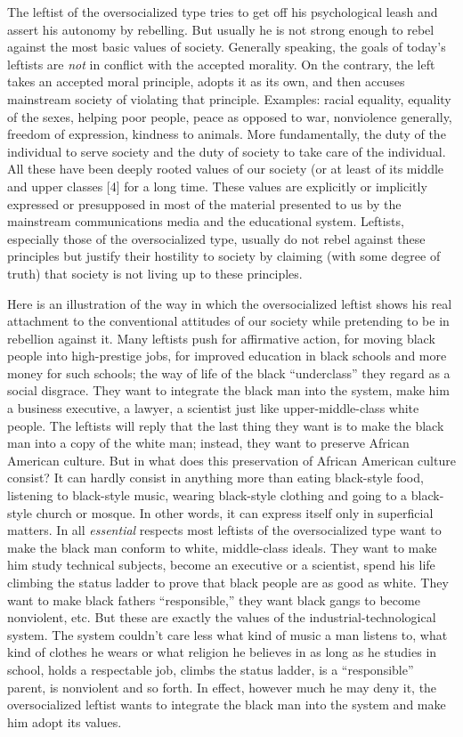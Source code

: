  The leftist of the oversocialized type tries to get off his psychological leash and assert his autonomy by rebelling. But usually he is not strong enough to rebel against the most basic values of society. Generally speaking, the goals of today’s leftists are {\em not} in conflict with the accepted morality. On the contrary, the left takes an accepted moral principle, adopts it as its own, and then accuses mainstream society of violating that principle. Examples: racial equality, equality of the sexes, helping poor people, peace as opposed to war, nonviolence generally, freedom of expression, kindness to animals. More fundamentally, the duty of the individual to serve society and the duty of society to take care of the individual. All these have been deeply rooted values of our society (or at least of its middle and upper classes [4] for a long time. These values are explicitly or implicitly expressed or presupposed in most of the material presented to us by the mainstream communications media and the educational system. Leftists, especially those of the oversocialized type, usually do not rebel against these principles but justify their hostility to society by claiming (with some degree of truth) that society is not living up to these principles.

 Here is an illustration of the way in which the oversocialized leftist shows his real attachment to the conventional attitudes of our society while pretending to be in rebellion against it. Many leftists push for affirmative action, for moving black people into high-prestige jobs, for improved education in black schools and more money for such schools; the way of life of the black “underclass” they regard as a social disgrace. They want to integrate the black man into the system, make him a business executive, a lawyer, a scientist just like upper-middle-class white people. The leftists will reply that the last thing they want is to make the black man into a copy of the white man; instead, they want to preserve African American culture. But in what does this preservation of African American culture consist? It can hardly consist in anything more than eating black-style food, listening to black-style music, wearing black-style clothing and going to a black- style church or mosque. In other words, it can express itself only in superficial matters. In all {\em essential} respects most leftists of the oversocialized type want to make the black man conform to white, middle-class ideals. They want to make him study technical subjects, become an executive or a scientist, spend his life climbing the status ladder to prove that black people are as good as white. They want to make black fathers “responsible,” they want black gangs to become nonviolent, etc. But these are exactly the values of the industrial-technological system. The system couldn’t care less what kind of music a man listens to, what kind of clothes he wears or what religion he believes in as long as he studies in school, holds a respectable job, climbs the status ladder, is a “responsible” parent, is nonviolent and so forth. In effect, however much he may deny it, the oversocialized leftist wants to integrate the black man into the system and make him adopt its values.

